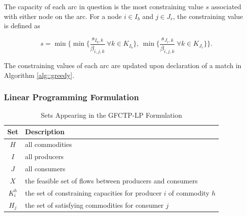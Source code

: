 The capacity of each arc in question is the most constraining value $s$
associated with either node on the arc. For a node $i \in I_b$ and $j \in J_r$,
the constraining value is defined as

\begin{equation}
  s = \min 
        \lbrace 
        \min \lbrace \frac{s_{I_b, k}}{\beta_{i, j, k}} 
        \: \forall k \in K_{I_b} \rbrace, 
        \: \min \lbrace \frac{s_{J_r, k}}{\beta_{i, j, k}} 
        \: \forall k \in K_{J_r} \rbrace
        \rbrace.
\end{equation}

The constraining values of each arc are updated upon declaration of a match in
Algorithm \ref{alg::greedy}.

\subsubsection{Linear Programming Formulation}\label{abm:dre:lp}

\begin{table} [h!]
\centering
\begin{tabularx}{\columnwidth-10pt}{|c|X|} %
\hline
Set         & Description \\
\hline
$H$         & all commodities  \\
$I$         & all producers  \\
$J$         & all consumers  \\
$X$         & the feasible set of flows between producers and consumers  \\
$K_{i}^{h}$  & the set of constraining capacities for 
            producer $i$ of commodity $h$  \\
$H_{j}$     & the set of satisfying commodities for consumer $j$  \\
\hline
\end{tabularx}
\caption{Sets Appearing in the GFCTP-LP Formulation}
\label{tbl:GFCTP-LP-sets}
\end{table}

